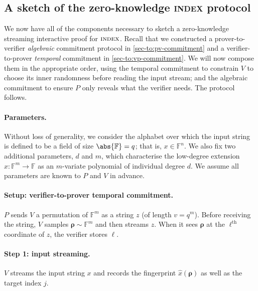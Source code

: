 \documentclass[a4paper,UKenglish,cleveref, autoref, thm-restate]{lipics-v2021}
\theoremstyle{definition}
\newcommand{\field}{\mathbb{F}}
\newcommand{\indexproblem}{\normalfont\textsc{index}\xspace}
\newcommand{\vcommitlength}{v}
\newcommand{\vcommitstring}{z}
\newcommand{\dimension}{m}
\newcommand{\degree}{d}
\newcommand{\fieldsize}{q}
\newcommand{\fingerprinttuple}{\bm{\rho}}
\begin{document}
\subsection{A sketch of the zero-knowledge {\indexproblem} protocol}
\label{sec-to:index-protocol}

    We now have all of the components necessary to sketch a zero-knowledge streaming interactive proof for $\indexproblem$. Recall that we constructed a prover-to-verifier \emph{algebraic} commitment protocol in \cref{sec-to:pv-commitment} and a verifier-to-prover \emph{temporal} commitment in \cref{sec-to:vp-commitment}. We will now compose them in the appropriate order, using the temporal commitment to constrain $V$ to choose its inner randomness before reading the input stream; and the algebraic commitment to ensure $P$ only reveals what the verifier needs.
    The protocol follows.
    
    \paragraph*{Parameters\iflipics\else.\fi}
    Without loss of generality, we consider the alphabet over which the input string is defined to be a field of size $\abs{\field} = \fieldsize$; that is, $x \in \field^n$. We also fix two additional parameters, $\degree$ and $\dimension$, which characterise the low-degree extension $\hat x: \field^\dimension \to \field$ as an $\dimension$-variate polynomial of individual degree $\degree$. We assume all parameters are known to $P$ and $V$ in advance.
    
    \paragraph*{Setup: verifier-to-prover temporal commitment\iflipics\else.\fi} $P$ sends $V$ a permutation of $\field^\dimension$ as a string $\vcommitstring$ (of length $\vcommitlength = \fieldsize^\dimension$). Before receiving the string, $V$ samples $\fingerprinttuple \sim \field^\dimension$ and then streams $\vcommitstring$. When it sees $\fingerprinttuple$ at the $\ell^\text{th}$ coordinate of $z$, the verifier stores $\ell$.

    \paragraph*{Step 1: input streaming\iflipics\else.\fi} $V$ streams the input string $x$ and records the fingerprint $\hat x(\fingerprinttuple)$ as well as the target index $j$.
\end{document}
